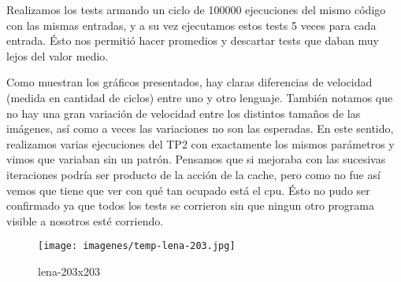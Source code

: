 Realizamos los tests armando un ciclo de 100000 ejecuciones del mismo c\'odigo con las mismas entradas, y a su vez ejecutamos estos tests 5 veces para cada entrada. \'Esto nos 
permiti\'o hacer promedios y descartar tests que daban muy lejos del valor medio.

Como muestran los gr\'aficos presentados, hay claras diferencias de velocidad (medida en cantidad de ciclos) entre uno y otro lenguaje. Tambi\'en notamos que no hay una gran 
variaci\'on de velocidad entre los distintos tamaños de las im\'agenes, as\'i como a veces las variaciones no son las esperadas. En este sentido, realizamos varias ejecuciones 
del TP2 con exactamente los mismos par\'ametros y vimos que variaban sin un patr\'on. Pensamos que si mejoraba con las sucesivas iteraciones podr\'ia ser 
producto de la acci\'on de la cache, pero como no fue as\'i vemos que tiene que ver con qu\'e tan ocupado est\'a el cpu. \'Esto no pudo ser confirmado ya que todos 
los tests se corrieron sin que ningun otro programa visible a nosotros est\'e corriendo.
\begin{figure}
  \begin{center}
	\texttt{[image: imagenes/temp-lena-203.jpg]}
	\caption{lena-203x203}
	\label{lena-203x203}
  \end{center}
\end{figure}

